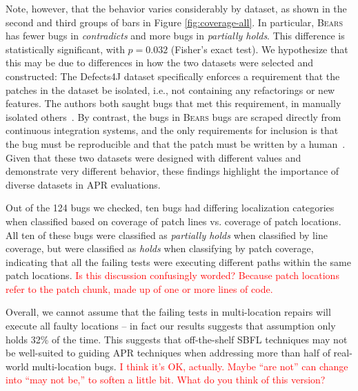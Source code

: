 \documentclass[10pt, conference]{IEEEtran}
\newcommand\todo[1]{\textcolor{red}{#1}}
\newcommand\bears{\textsc{Bears}\xspace}
\begin{document}
Note, however, that the behavior varies considerably by dataset, as shown in the second and 
third groups of bars in Figure \ref{fig:coverage-all}. In particular, \bears has fewer bugs in 
\emph{contradicts} and more bugs in \emph{partially holds}.
This difference is statistically significant, with $p = 0.032$ (Fisher's exact test).
We hypothesize that this may be due to differences in how the two  
datasets were selected and constructed:
The Defects4J dataset specifically enforces a requirement that the patches in the 
dataset be isolated, i.e., not containing any refactorings or new features.
The authors both saught bugs that met this requirement, in manually isolated others~\cite{defects4j}. By contrast, the 
bugs in 
\bears bugs are scraped directly from continuous integration systems, and the 
only requirements for inclusion is that the bug must be reproducible and that
the patch must be written by a human~\cite{bears}. 
Given that these two datasets were designed with different values and demonstrate very 
different behavior, these findings highlight the importance of diverse datasets
in APR evaluations. 

Out of the 124 bugs we checked, ten bugs had differing localization categories when 
classified based on coverage of patch lines vs. coverage of patch locations. All ten of these 
bugs 
were classified as \emph{partially holds} when classified by line coverage, but were classified as 
\emph{holds} when classifying by patch coverage, indicating that all the failing tests were 
executing different paths within the same patch locations. \todo{Is this discussion confusingly 
worded? Because patch locations refer to the patch chunk, made up of one or more lines of 
code.}

Overall, we cannot assume that the failing tests in multi-location repairs will execute all 
faulty locations -- in fact our results suggests that assumption only holds 32\% of the time. 
This suggests that off-the-shelf SBFL techniques may not be
well-suited to guiding APR techniques when addressing more than half of
real-world multi-location bugs. \todo{I think it's OK, actually.
Maybe ``are not'' can change into ``may not be,'' to soften a little bit. What
do you think of this version?}
\end{document}
